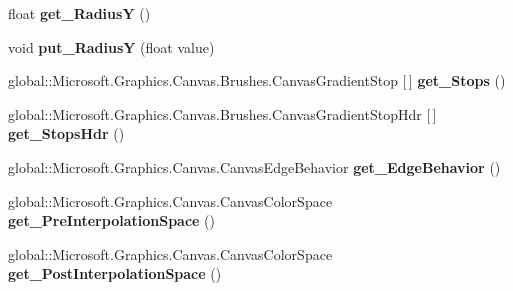 \begin{DoxyCompactItemize}
float {\bfseries get\+\_\+\+RadiusY} ()
\item 
\mbox{\label{interface_microsoft_1_1_graphics_1_1_canvas_1_1_brushes_1_1_i_canvas_radial_gradient_brush_adacfea58dfcbca1bf2b268dc506348c2}} 
void {\bfseries put\+\_\+\+RadiusY} (float value)
\item 
\mbox{\label{interface_microsoft_1_1_graphics_1_1_canvas_1_1_brushes_1_1_i_canvas_radial_gradient_brush_a234e96cc9714d0dc7f83e5a3b0edb97b}} 
global\+::\+Microsoft.\+Graphics.\+Canvas.\+Brushes.\+Canvas\+Gradient\+Stop \mbox{[}$\,$\mbox{]} {\bfseries get\+\_\+\+Stops} ()
\item 
\mbox{\label{interface_microsoft_1_1_graphics_1_1_canvas_1_1_brushes_1_1_i_canvas_radial_gradient_brush_a5e26c90888f077b5389c6a1f12f7bad4}} 
global\+::\+Microsoft.\+Graphics.\+Canvas.\+Brushes.\+Canvas\+Gradient\+Stop\+Hdr \mbox{[}$\,$\mbox{]} {\bfseries get\+\_\+\+Stops\+Hdr} ()
\item 
\mbox{\label{interface_microsoft_1_1_graphics_1_1_canvas_1_1_brushes_1_1_i_canvas_radial_gradient_brush_a39b492f31e55c07f0d42c2346d9254ed}} 
global\+::\+Microsoft.\+Graphics.\+Canvas.\+Canvas\+Edge\+Behavior {\bfseries get\+\_\+\+Edge\+Behavior} ()
\item 
\mbox{\label{interface_microsoft_1_1_graphics_1_1_canvas_1_1_brushes_1_1_i_canvas_radial_gradient_brush_aecbd9073ead650eee36140f73468fb9b}} 
global\+::\+Microsoft.\+Graphics.\+Canvas.\+Canvas\+Color\+Space {\bfseries get\+\_\+\+Pre\+Interpolation\+Space} ()
\item 
\mbox{\label{interface_microsoft_1_1_graphics_1_1_canvas_1_1_brushes_1_1_i_canvas_radial_gradient_brush_a2c50ad2b61a126873338d5ea34c679a4}} 
global\+::\+Microsoft.\+Graphics.\+Canvas.\+Canvas\+Color\+Space {\bfseries get\+\_\+\+Post\+Interpolation\+Space} ()

\end{DoxyCompactItemize}
